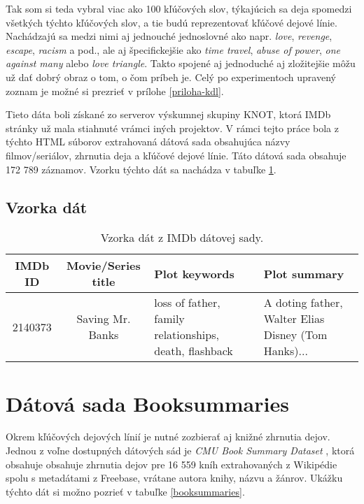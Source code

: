 Tak som si teda vybral viac ako 100 kľúčových slov, týkajúcich sa deja spomedzi všetkých týchto kľúčových slov, a tie budú reprezentovať kľúčové dejové línie. Nachádzajú sa medzi nimi aj jednouché jednoslovné ako napr. \textit{love}, \textit{revenge}, \textit{escape}, \textit{racism} a pod., ale aj špecifickejšie ako \textit{time travel}, \textit{abuse of power}, \textit{one against many} alebo \textit{love triangle}. Takto spojené aj jednoduché aj zložitejšie môžu už dať dobrý obraz o tom, o čom príbeh je. Celý po experimentoch upravený zoznam je možné si prezrieť v prílohe \ref{priloha-kdl}. 

Tieto dáta boli získané zo serverov výskumnej skupiny KNOT, ktorá IMDb stránky už mala stiahnuté vrámci iných projektov. V rámci tejto práce bola z týchto HTML súborov extrahovaná dátová sada obsahujúca názvy filmov/seriálov, zhrnutia deja a kľúčové dejové línie. Táto dátová sada obsahuje 172 789 záznamov. Vzorku týchto dát sa nachádza v tabuľke \ref{imdb}.

\subsection*{Vzorka dát}

\begin{table}[hbt]
\centering
\caption{Vzorka dát z IMDb dátovej sady.}
\label{imdb}
\begin{tabular}{|c|c|
>{\centering\arraybackslash}m{7em}|
>{\centering\arraybackslash}m{7em}|}
\hline
IMDb ID & Movie/Series title & Plot keywords & Plot summary \\
\hline
2140373 & Saving Mr. Banks & loss of father, family relationships, death, flashback &  A doting father, Walter Elias Disney (Tom Hanks)...\\ 
\hline

\end{tabular}
\end{table}

\section{Dátová sada Booksummaries}
Okrem kľúčových dejových línií je nutné zozbierať aj knižné zhrnutia dejov. Jednou z voľne dostupných dátových sád je \textit{CMU Book Summary Dataset} \cite{Bamman:2013}, ktorá obsahuje obsahuje zhrnutia dejov pre 16 559 kníh extrahovaných z Wikipédie spolu s metadátami z Freebase, vrátane autora knihy, názvu a žánrov. Ukážku týchto dát si možno pozrieť v tabuľke \ref{booksummaries}.


